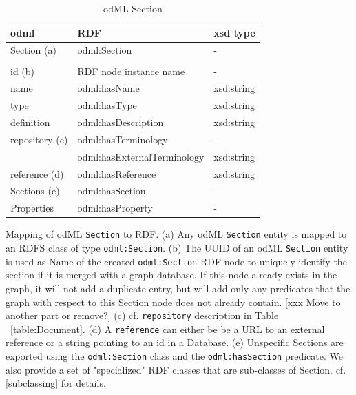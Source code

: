 \documentclass{article}
\begin{document}
\begin{table}
\begin{threeparttable}
\begin{tabular}{lll}
\toprule
    odml            & RDF                             & xsd type \\
\midrule
    Section (a)     & odml:Section                    & - \\
                    & & \\
    id (b)          & RDF node instance name          & - \\
    name            & odml:hasName                    & xsd:string \\
    type            & odml:hasType                    & xsd:string \\
    definition      & odml:hasDescription             & xsd:string \\
    repository (c)  & odml:hasTerminology             & - \\
                    & odml:hasExternalTerminology     & xsd:string \\
    reference (d)   & odml:hasReference               & xsd:string \\
    Sections (e)    & odml:hasSection                 & - \\
    Properties      & odml:hasProperty                & - \\
\bottomrule
\end{tabular}
\caption{odML Section}
\begin{tablenotes}
\item Mapping of odML \texttt{Section} to RDF. (a) Any odML \texttt{Section} entity is mapped to an RDFS class of type \texttt{odml:Section}. (b) The UUID of an odML \texttt{Section} entity is used as Name of the created \texttt{odml:Section} RDF node to uniquely identify the section if it is merged with a graph database. If this node already exists in the graph, it will not add a duplicate entry, but will add only any predicates that the graph with respect to this Section node does not already contain. [xxx Move to another part or remove?] (c) cf. \texttt{repository} description in Table ~\ref{table:Document}. (d) A \texttt{reference} can either be be a URL to an external reference or a string pointing to an id in a Database. (e) Unspecific Sections are exported using the \texttt{odml:Section} class and the \texttt{odml:hasSection} predicate. We also provide a set of "specialized" RDF classes that are sub-classes of Section. cf. [subclassing] for details.
\end{tablenotes}
\label{table:Section}
\end{threeparttable}
\end{table}
\end{document}
